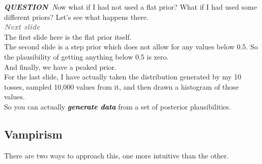 \documentclass[14pt]{extarticle}
\newcommand{\mynotes}[2][Gray]{\textcolor{#1}{\textbf{\textit{#2}}}}
\newcommand{\question}[1]{\textit{\textbf{QUESTION~}#1}}
\begin{document}
\question Now what if I had not used a flat prior? What if I had used some different priors? Let's see what happens there. \\

\mynotes{Next slide} \\

The first slide here is the flat prior itself. \\

The second slide is a step prior which does not allow for any values below 0.5. So the plausibility of getting anything below 0.5 is zero. \\

And finally, we have a peaked prior. \\

For the last slide, I have actually taken the distribution generated by my 10 tosses, sampled 10,000 values from it, and then drawn a histogram of those values. \\

So you can actually \mynotes[black]{generate data} from a set of posterior plausibilities.


\subsection{Vampirism}

There are two ways to approach this, one more intuitive than the other. 
\end{document}

